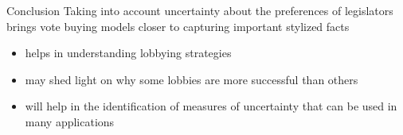 \documentclass{beamer}
\begin{document}
\begin{frame}{Conclusion}
Taking into account uncertainty about the preferences of legislators brings vote buying models closer to capturing important stylized facts
\pause
\begin{itemize}[<+->]
		\item helps in understanding lobbying strategies
		\item may shed light on why some lobbies are more successful than others
		\item will help in the identification of measures of uncertainty that can be used in many applications
\end{itemize}

\end{frame}
\end{document}
